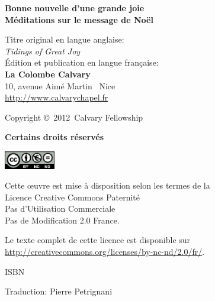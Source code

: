\newpage
\mbox{}
\vfill

{\scriptsize

\textbf{Bonne nouvelle d'une grande joie\\
 Méditations sur le message de No\"el}

Titre original en langue anglaise:\\
\emph{Tidings of Great Joy} \\

Édition et publication en langue fran\c{c}aise:\\
 {\bfseries La Colombe Calvary}\\
 10, avenue Aimé Martin ~Nice\\
 \url{http://www.calvarychapel.fr}

Copyright \copyright{}~2012~Calvary Fellowship

{\bfseries Certains droits réservés}

\includegraphics[width=6em]{by-nc-nd_eu}

Cette \oe{}uvre est mise à disposition selon les termes de la \\
 Licence Creative Commons Paternité \\
 \ocadr Pas d'Utilisation Commerciale \\
 \ocadr Pas de Modification 2.0 France.

Le texte complet de cette licence est disponible sur \\
 \url{http://creativecommons.org/licenses/by-nc-nd/2.0/fr/}.

ISBN~\isbn

Traduction: Pierre Petrignani


}

